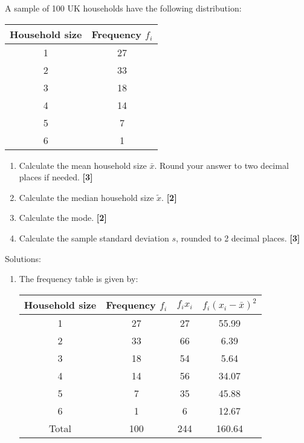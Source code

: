 \documentclass[a4paper, leqno, 12pt]{article} %
\newenvironment{top_enumerate}{
\begin{enumerate}
  \setlength{\itemsep}{2em}
  \setlength{\topsep}{-0pt}
  \setlength{\partopsep}{-0pt}
}{\end{enumerate}}
\begin{document}
\begin{top_enumerate}

\item A sample of 100 UK households have the following distribution:

\begin{center}
\begin{tabular}{cc}
Household size & Frequency $f_i$ \\
\hline
1 & {27} \\
2 & {33} \\
3 & {18} \\
4 & {14} \\
5 & {7} \\
6 & {1} \\
\hline
\end{tabular}
\end{center}
 
\setcounter{equation}{0}  %
\begin{enumerate}
	\setlength{\topsep}{-0pt}
	\setlength{\partopsep}{-0pt}
	\setlength{\itemsep}{10pt}
			\item Calculate the mean household size $\bar x$. Round your answer to two decimal places if needed.
	 \quad \textbf{[3]}
		\item Calculate the median household size $\tilde x$.
	 \quad \textbf{[2]}
		\item Calculate the mode.
	 \quad \textbf{[2]}
		\item Calculate the sample standard deviation $s$, rounded to 2 decimal places.
	 \quad \textbf{[3]}
\end{enumerate}\addtocounter{enumi}{-1}
\item Solutions:
 
\setcounter{equation}{0}  %
\begin{enumerate}
	\setlength{\topsep}{-0pt}
	\setlength{\partopsep}{-0pt}
	\setlength{\itemsep}{10pt}
			\item The frequency table is given by:
	
	\begin{center}
	\begin{tabular}{cccc}
	Household size & Frequency $f_i$ & $f_i x_i$ & $f_i (x_i-\bar x)^2$\\
	\hline
	1 & {27} & {27} & {55.99}\\
	2 & {33} & {66} & {6.39}\\
	3 & {18} & {54} & {5.64}\\
	4 & {14} & {56} & {34.07}\\
	5 & {7} & {35} & {45.88}\\
	6 & {1} & {6} & {12.67}\\
	\hline
	Total & 100 & {244} & {160.64} \\
	\hline
	\end{tabular}
	\end{center}
	

\end{enumerate}
\end{top_enumerate}
\end{document}
